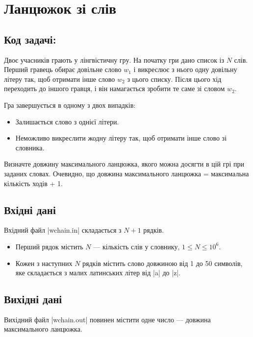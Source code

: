 \documentclass[12pt,a4paper]{article}
\begin{document}
\section*{Ланцюжок зі слів \hfill {}}


\subsection*{Код задачі: }

Двоє учасників грають у лінгвістичну гру.
На початку гри дано список із \(N\) слів. Перший гравець обирає довільне слово \(w_1\) і викреслює з нього одну довільну літеру так, щоб отримати інше слово \(w_2\) з цього списку. Після цього хід переходить до іншого гравця, і він намагається зробити те саме зі словом \(w_2\).

Гра завершується в одному з двох випадків:

\begin{itemize}
    \item Залишається слово з однієї літери.
    \item Неможливо викреслити жодну літеру так, щоб отримати інше слово зі словника.
\end{itemize}

Визначте довжину максимального ланцюжка, якого можна досягти в цій грі при заданих словах. Очевидно, що довжина максимального ланцюжка = максимальна кількість ходів + 1.


\subsection*{Вхідні дані}

Вхідний файл |wchain.in| складається з \(N + 1\) рядків.
\begin{itemize}
    \item Перший рядок містить \(N\) --- кількість слів у словнику, \(1 \leq N \leq 10^6\).
    \item Кожен з наступних \(N\) рядків містить слово довжиною від 1 до 50 символів, яке складається з малих латинських літер від |a| до |z|.
\end{itemize}


\subsection*{Вихідні дані}

Вихідний файл |wchain.out| повинен містити одне число --- довжина максимального ланцюжка.
\end{document}
